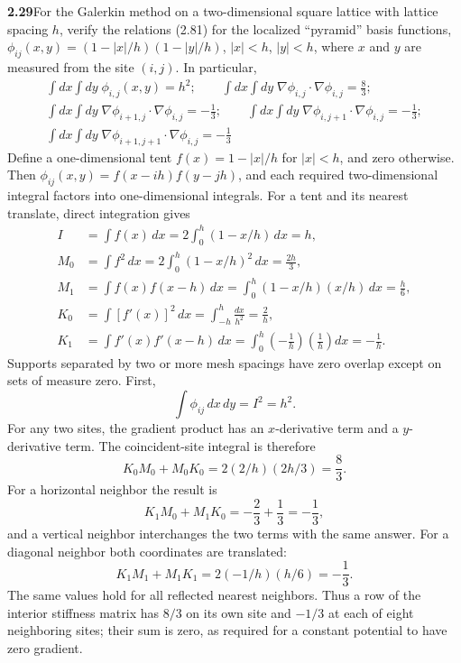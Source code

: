 \par\bigskip
\noindent\textbf{2.29}\quad For the Galerkin method on a two-dimensional square lattice with lattice spacing $h$, verify the relations (2.81) for the localized ``pyramid'' basis functions, $\phi_{ij}(x,y)=(1-|x|/h)(1-|y|/h)$, $|x|<h$, $|y|<h$, where $x$ and $y$ are measured from the site $(i,j)$. In particular,
\begin{gather*}
\int dx\int dy\;\phi_{i,j}(x,y) = h^{2};\qquad
\int dx\int dy\;\nabla\phi_{i,j}\cdot\nabla\phi_{i,j} = \frac{8}{3};\\
\int dx\int dy\;\nabla\phi_{i+1,j}\cdot\nabla\phi_{i,j} = -\frac{1}{3};\qquad
\int dx\int dy\;\nabla\phi_{i,j+1}\cdot\nabla\phi_{i,j} = -\frac{1}{3};\\
\int dx\int dy\;\nabla\phi_{i+1,j+1}\cdot\nabla\phi_{i,j} = -\frac{1}{3}
\end{gather*}
\solution
Define a one-dimensional tent
$f(x)=1-|x|/h$ for $|x|<h$, and zero otherwise. Then
$\phi_{ij}(x,y)=f(x-ih)f(y-jh)$, and each required two-dimensional
integral factors into one-dimensional integrals. For a tent and its
nearest translate, direct integration gives
\begin{align*}
I&=\int f(x)\,dx=2\int_0^h(1-x/h)\,dx=h,\\
M_0&=\int f^2\,dx=2\int_0^h(1-x/h)^2\,dx=\frac{2h}{3},\\
M_1&=\int f(x)f(x-h)\,dx
=\int_0^h(1-x/h)(x/h)\,dx=\frac h6,\\
K_0&=\int[f'(x)]^2\,dx=\int_{-h}^h\frac{dx}{h^2}=\frac2h,\\
K_1&=\int f'(x)f'(x-h)\,dx
=\int_0^h\left(-\frac1h\right)\left(\frac1h\right)dx=-\frac1h.
\end{align*}
Supports separated by two or more mesh spacings have zero overlap
except on sets of measure zero. First,
\[
\boxed{\int\phi_{ij}\,dx\,dy=I^2=h^2.}
\]
For any two sites, the gradient product has an $x$-derivative term
and a $y$-derivative term. The coincident-site integral is therefore
\[
\boxed{K_0M_0+M_0K_0=2(2/h)(2h/3)=\frac83.}
\]
For a horizontal neighbor the result is
\[
\boxed{K_1M_0+M_1K_0=-\frac23+\frac13=-\frac13,}
\]
and a vertical neighbor interchanges the two terms with the same
answer. For a diagonal neighbor both coordinates are translated:
\[
\boxed{K_1M_1+M_1K_1=2(-1/h)(h/6)=-\frac13.}
\]
The same values hold for all reflected nearest neighbors. Thus a
row of the interior stiffness matrix has $8/3$ on its own site and
$-1/3$ at each of eight neighboring sites; their sum is zero,
as required for a constant potential to have zero gradient.

